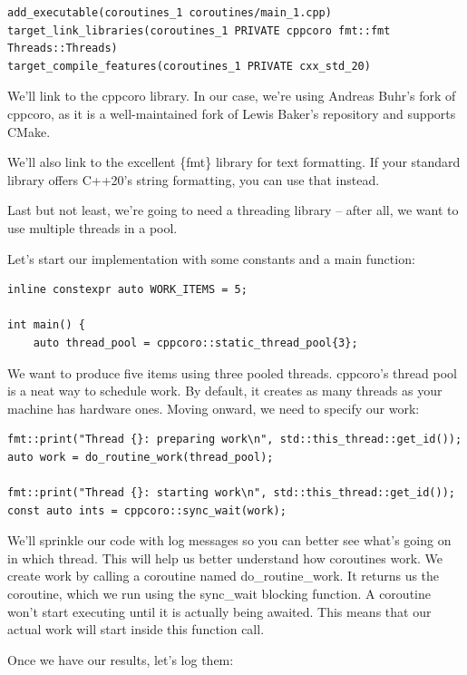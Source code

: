 \begin{lstlisting}[style=styleCMake]
add_executable(coroutines_1 coroutines/main_1.cpp)
target_link_libraries(coroutines_1 PRIVATE cppcoro fmt::fmt
Threads::Threads)
target_compile_features(coroutines_1 PRIVATE cxx_std_20)
\end{lstlisting}

We'll link to the cppcoro library. In our case, we're using Andreas Buhr's fork of cppcoro, as it is a well-maintained fork of Lewis Baker's repository and supports CMake. 

We'll also link to the excellent \{fmt\} library for text formatting. If your standard library offers C++20's string formatting, you can use that instead.

Last but not least, we're going to need a threading library – after all, we want to use multiple threads in a pool.

Let's start our implementation with some constants and a main function:

\begin{lstlisting}[style=styleCXX]
inline constexpr auto WORK_ITEMS = 5;

int main() {
	auto thread_pool = cppcoro::static_thread_pool{3};
\end{lstlisting}

We want to produce five items using three pooled threads. cppcoro's thread pool is a neat way to schedule work. By default, it creates as many threads as your machine has hardware ones. Moving onward, we need to specify our work:

\begin{lstlisting}[style=styleCXX]
fmt::print("Thread {}: preparing work\n", std::this_thread::get_id());
auto work = do_routine_work(thread_pool);

fmt::print("Thread {}: starting work\n", std::this_thread::get_id());
const auto ints = cppcoro::sync_wait(work);
\end{lstlisting}

We'll sprinkle our code with log messages so you can better see what's going on in which thread. This will help us better understand how coroutines work. We create work by calling a coroutine named do\_routine\_work. It returns us the coroutine, which we run using the sync\_wait blocking function. A coroutine won't start executing until it is actually being awaited. This means that our actual work will start inside this function call.

Once we have our results, let's log them:

